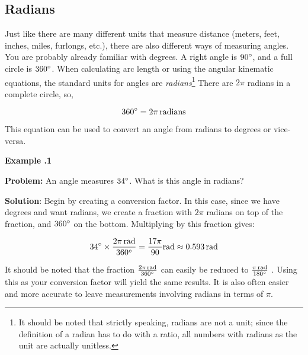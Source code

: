 \subsection{Radians} 

Just like there are many different units that measure distance (meters, feet, inches, miles, furlongs, etc.), there are also different ways of measuring angles.  You are probably already familiar with degrees. A right angle is $90 \degree$, and a full circle is $360 \degree$.  When calculating arc length or using the angular kinematic equations, the standard units for angles are \textit{radians}\footnote{It should be noted that strictly speaking, radians are not a unit; since the definition of a radian has to do with a ratio, all numbers with radians as the unit are actually unitless.}  There are $2 \pi$ radians in a complete circle, so,

	\begin{mdframed}[backgroundcolor=green!20!white]
	\begin{equation*}
		360 \degree = 2 \pi \, \si{radians}
		\label{conversion:radiandegree}
	\end{equation*}
\end{mdframed}	

This equation can be used to convert an angle from radians to degrees or vice-versa.  

 \begin{mdframed}[backgroundcolor=blue!10!white]
	\begin{center}	
		\textbf{Example \thesection.1}	
	\end{center}
	
	\textbf{Problem:} An angle measures $34 \degree$.  What is this angle in radians? 
	
	\vspace{0.2 in} 
	\textbf{Solution}: Begin by creating a conversion factor.  In this case, since we have degrees and want radians, we create a fraction with $2\pi$ radians on top of the fraction, and $360\degree$ on the bottom.  Multiplying by this fraction gives:
	
\begin{equation*}
	34 \degree \times \frac{2 \pi \, \si{rad}}{360 \degree} = \frac{17 \pi}{90}\si{rad} \approx 0.593 \, \si{rad}  
\end{equation*}
	
	It should be noted that the fraction $\frac{2 \pi \, \si{rad}}{360 \degree}$ can easily be reduced to $\frac{ \pi \, \si{rad}}{180 \degree}$ .  Using this as your conversion factor will yield the same results.  It is also often easier and more accurate to leave measurements involving radians in terms of $\pi$.  
	
\end{mdframed}
   
